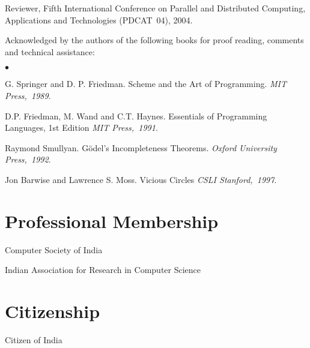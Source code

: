\documentclass[11pt,margin,line]{res}
\newenvironment{list2}{
  \begin{list}{$\bullet$}{%
      \setlength{\itemsep}{0in}
      \setlength{\parsep}{0in} \setlength{\parskip}{0in}
      \setlength{\topsep}{0in} \setlength{\partopsep}{0in} 
      \setlength{\leftmargin}{0.2in}}}{\end{list}}
\begin{document}
\begin{resume}
Reviewer, Fifth International Conference on Parallel and
Distributed Computing, Applications and Technologies
(PDCAT~04), 2004.

Acknowledged by the authors of the following books for
proof reading, comments  and technical assistance:\\
\begin{list2}
 \item G. Springer and D. P. Friedman.  {Scheme and the Art of
 Programming}.  {\em {MIT Press,~1989}}.
 \item D.P. Friedman, M. Wand and C.T. Haynes.  Essentials of
 Programming Languages, 1st Edition  {\em {MIT Press,~1991}}.
 \item Raymond Smullyan. G\"{o}del's Incompleteness Theorems.
 {\em {Oxford University Press,~1992}}.
 \item Jon Barwise and Lawrence S. Moss. Vicious Circles
 {\em {CSLI Stanford,~1997}}.
\end{list2}






\section{\sc Professional Membership}

Computer Society of India

Indian Association for Research in Computer Science

\section{\sc Citizenship}
Citizen of India


\end{resume}
\end{document}
